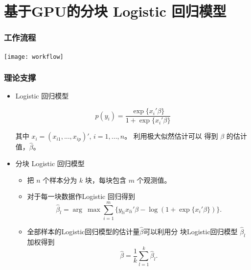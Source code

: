 \documentclass[10pt]{beamer}
\begin{document}
\section{基于GPU的分块 Logistic 回归模型}

\begin{frame}
  \frametitle{工作流程}
  \texttt{[image: workflow]}
\end{frame}


\begin{frame}
  \frametitle{理论支撑}

  \begin{itemize}
  \item Logistic 回归模型

    \begin{equation*}
      p(y_i) = \frac{\exp\{x_i'\beta\}}{1+\exp\{x_i'\beta\}}
    \end{equation*}

    其中 $x_i=(x_{i1},...,x_{ip})'$, $i=1,...,n$。 利用极大似然估计可以
    得到 $\beta$ 的估计值，$\widehat \beta$。

  \item 分块 Logistic 回归模型

    \begin{itemize}
    \item 把 $n$ 个样本分为 $k$ 块，每块包含 $m$ 个观测值。
    \item 对于每一块数据作Logistic 回归得到
      \begin{equation*}
        \widehat \beta_l = \arg~\max \sum _{i =1}^m \{ y_{li}x_{li}'\beta-\log(1+\exp\{x_i'\beta\})\}.
      \end{equation*}

    \item 全部样本的Logistic回归模型的估计量$\widehat \beta$可以利用分
      块Logistic回归模型 $\widehat \beta_l$ 加权得到
      \begin{equation*}
        \widehat \beta = \frac{1}{k}\sum_{l=1}^k \widehat \beta_l.
      \end{equation*}
    \end{itemize}

  \end{itemize}


\end{frame}
\end{document}
